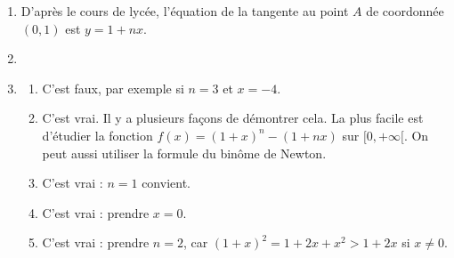 \documentclass[11pt,a4paper]{article}
\begin{document}
	\begin{corrige}
		\begin{enumerate}
			
			\item  D'après le cours de lycée, l'équation de la tangente au point $A$ de coordonnée $(0,1)$ est $y=1+nx$.
			
			\item  
			
			\item  
			
			\begin{enumerate}
				
				\item  C'est faux, par exemple si $n=3$ et $x=-4$.
				
				\item  C'est vrai. Il y a plusieurs façons de démontrer cela. La plus facile est d'étudier la fonction 
				$f(x)=(1+x)^n-(1+nx)$ sur $[0,+\infty[$. On peut aussi utiliser la formule du binôme de Newton.
				
				\item  C'est vrai : $n=1$ convient.
				
				\item  C'est vrai : prendre $x=0$.
				
				\item  C'est vrai : prendre $n=2$, car $(1+x)^2=1+2x+x^2>1+2x$ si $x\neq 0$.
				
			\end{enumerate}
			
			
		\end{enumerate}
	\end{corrige}
	
\end{document}

